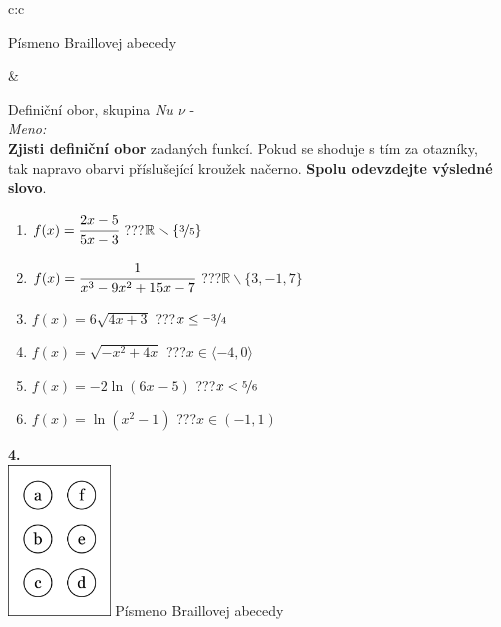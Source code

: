 \documentclass[10pt]{report}
\begin{document}
\begin{tabular}{c:c}
\begin{minipage}[c][99mm][t]{0.49\linewidth}
\begin{center}
\begin{minipage}{0.20\linewidth}
\begin{center}
{\small Písmeno Braillovej abecedy}
\end{center}
\end{minipage}
\end{center}
\end{minipage}
&
\begin{minipage}[c][99mm][t]{0.49\linewidth}
\begin{center}
\vspace{7mm}
{\huge Definiční obor, skupina \textit{Nu $\nu$} -}\\[4.5mm]
\textit{Meno:}\phantom{xxxxxxxxxxxxxxxxxxxxxxxxxxxxxxxxxxxxxxxxxxxxxxxxxxxxxxxxxxxxxxxxx}\\[3.5mm]
\textbf{Zjisti definiční obor} zadaných funkcí. Pokud se shoduje s tím za otazníky,\\tak napravo obarvi příslušející kroužek načerno. \textbf{Spolu odevzdejte výsledné slovo}.\\[3mm]
\begin{minipage}{0.77\linewidth}
\begin{center}
\begin{varwidth}{\textwidth}
\begin{enumerate}
\normalsize
\item $f(x)=\cfrac{2x-5}{5x-3}$\quad \dotfill\; ???\;\dotfill \quad $\mathbb{R}\smallsetminus\{\nicefrac{3}{5}\}$
\item $f(x)=\cfrac{1}{x^3-9x^2+15x-7}$\quad \dotfill\; ???\;\dotfill \quad $\mathbb{R}\smallsetminus\{3,-1,7\}$
\item $f(x)=6\sqrt{4x+3}$\quad \dotfill\; ???\;\dotfill \quad $x\leq\nicefrac{-3}{4}$
\item $f(x)=\sqrt{-x^2+4x}$\quad \dotfill\; ???\;\dotfill \quad $x\in\langle-4 , 0\rangle$
\item $f(x)=-2\ln{(6x-5)}$\quad \dotfill\; ???\;\dotfill \quad $x<\nicefrac{5}{6}$
\item $f(x)=\ln{(x^2-1)}$\quad \dotfill\; ???\;\dotfill \quad $x\in(-1 , 1)$
\end{enumerate}
\end{varwidth}
\end{center}
\end{minipage}
\begin{minipage}{0.20\linewidth}
\begin{center}
{\Huge\bfseries 4.} \\[2mm]
\includegraphics[height=40mm]{../images/braille.png}
{\small Písmeno Braillovej abecedy}
\end{center}
\end{minipage}
\end{center}
\end{minipage}
%
\end{tabular}
\end{document}
